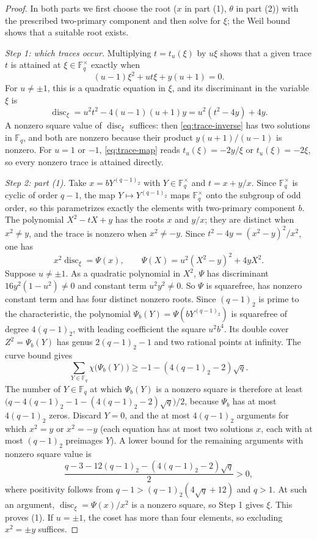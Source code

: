 \documentclass[11pt]{article}
\theoremstyle{plain}
\theoremstyle{definition}
\theoremstyle{remark}
\newcommand{\F}{\mathbb F}
\begin{document}
\begin{proof}
In both parts we first choose the root ($x$ in part (1), $\theta$ in part (2))
with the prescribed two-primary component and then solve for $\xi$; the
Weil bound shows that a suitable root exists.

\emph{Step 1: which traces occur.}  Multiplying $t=t_u(\xi)$ by $u\xi$
shows that a given trace $t$ is attained at $\xi\in\F_q^\times$ exactly
when
\begin{equation}\label{eq:trace-inverse}
 (u-1)\xi^2+ut\xi+y(u+1)=0.
\end{equation}
For $u\ne\pm1$, this is a quadratic equation in $\xi$, and its
discriminant in the variable $\xi$ is
\[
 \operatorname{disc}_\xi=u^2t^2-4(u-1)(u+1)y=u^2(t^2-4y)+4y.
\]
A nonzero square value of $\operatorname{disc}_\xi$ suffices: then
\eqref{eq:trace-inverse} has two solutions in $\F_q$, and both are
nonzero because their product $y(u+1)/(u-1)$ is nonzero.  For $u=1$ or
$-1$, \eqref{eq:trace-map} reads $t_u(\xi)=-2y/\xi$ or $t_u(\xi)=-2\xi$,
so every nonzero trace is attained directly.

\emph{Step 2: part (1).}  Take $x=bY^{(q-1)_2}$ with
$Y\in\F_q^\times$ and $t=x+y/x$.  Since $\F_q^\times$ is cyclic of order
$q-1$, the map $Y\mapsto Y^{(q-1)_2}$ maps $\F_q^\times$ onto the subgroup of
odd order, so this parametrizes exactly the elements with two-primary
component $b$.  The polynomial $X^2-tX+y$ has the roots $x$ and $y/x$;
they are distinct when $x^2\ne y$, and the trace is nonzero when
$x^2\ne-y$.  Since $t^2-4y=(x^2-y)^2/x^2$, one has
\[
 x^2\operatorname{disc}_\xi=\Psi(x),\qquad
 \Psi(X)=u^2(X^2-y)^2+4yX^2.
\]
Suppose $u\ne\pm1$.  As a quadratic polynomial in $X^2$, $\Psi$ has
discriminant $16y^2(1-u^2)\ne0$ and constant term $u^2y^2\ne0$.  So $\Psi$
is squarefree, has nonzero constant term and has four distinct nonzero
roots.  Since $(q-1)_2$ is prime to the characteristic, the polynomial
$\Psi_b(Y)=\Psi(bY^{(q-1)_2})$ is squarefree of degree $4(q-1)_2$, with leading coefficient
the square $u^2b^4$.  Its double cover $Z^2=\Psi_b(Y)$ has genus $2(q-1)_2-1$ and two
rational points at infinity.  The curve bound gives
\[
 \sum_{Y\in\F_q}\chi\bigl(\Psi_b(Y)\bigr)\ge-1-(4(q-1)_2-2)\sqrt q .
\]
The number of $Y\in\F_q$ at which $\Psi_b(Y)$ is a nonzero square is therefore
at least $\bigl(q-4(q-1)_2-1-(4(q-1)_2-2)\sqrt q\bigr)/2$, because $\Psi_b$ has at most $4(q-1)_2$
zeros.  Discard $Y=0$, and the at most $4(q-1)_2$ arguments for which $x^2=y$ or
$x^2=-y$ (each equation has at most two solutions $x$, each with at most
$(q-1)_2$ preimages $Y$).  A lower bound for the remaining arguments with
nonzero square value is
\[
 \frac{q-3-12(q-1)_2-(4(q-1)_2-2)\sqrt q}{2}>0,
\]
where positivity follows from $q-1>(q-1)_2(4\sqrt q+12)$ and $q>1$.  At such an argument,
$\operatorname{disc}_\xi=\Psi(x)/x^2$ is a nonzero square, so Step 1 gives
$\xi$.  This proves (1).  If $u=\pm1$, the coset has more than four
elements, so excluding $x^2=\pm y$ suffices.


\end{proof}
\end{document}
